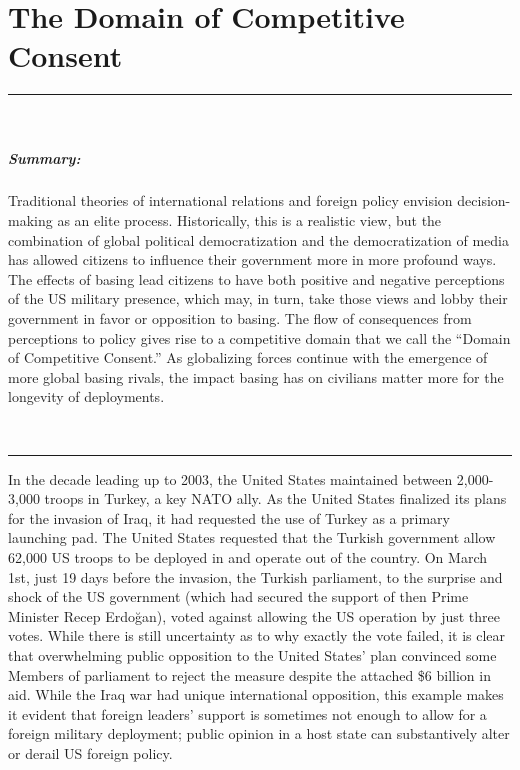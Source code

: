 \chapter{The Domain of Competitive Consent \label{cha:theory}}

\vspace*{-0.85cm}
\rule{\linewidth}{0.10pt} \\[-1.25cm]
{\footnotesize\paragraph{Summary:} Traditional theories of international relations and foreign policy envision decision-making as an elite process. Historically, this is a realistic view, but the combination of global political democratization and the democratization of media has allowed citizens to influence their government more in more profound ways. The effects of basing lead citizens to have both positive and negative perceptions of the US military presence, which may, in turn, take those views and lobby their government in favor or opposition to basing. The flow of consequences from perceptions to policy gives rise to a competitive domain that we call the ``Domain of Competitive Consent.'' As globalizing forces continue with the emergence of more global basing rivals, the impact basing has on civilians matter more for the longevity of deployments.} 
\\[-0.5cm] 
\rule{\linewidth}{0.10pt}

In the decade leading up to 2003, the United States maintained between 2,000-3,000 troops in Turkey, a key NATO ally. As the United States finalized its plans for the invasion of Iraq, it had requested the use of Turkey as a primary launching pad. The United States requested that the Turkish government allow 62,000 US troops to be deployed in and operate out of the country. On March 1st, just 19 days before the invasion, the Turkish parliament, to the surprise and shock of the US government (which had secured the support of then Prime Minister Recep Erdo\u{g}an), voted against allowing the US operation by just three votes. While there is still uncertainty as to why exactly the vote failed, it is clear that overwhelming public opposition to the United States' plan convinced some Members of parliament to reject the measure despite the attached \$6 billion in aid.\autocite{CSR2003,Cooley2008,altinay2009} While the Iraq war had unique international opposition, this example makes it evident that foreign leaders' support is sometimes not enough to allow for a foreign military deployment; public opinion in a host state can substantively alter or derail US foreign policy.

